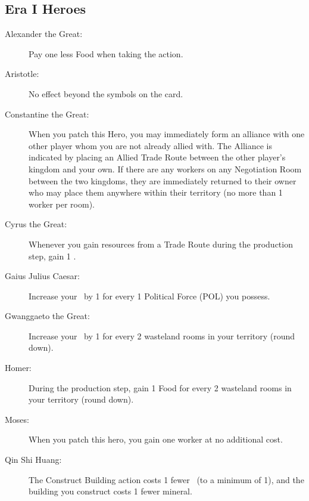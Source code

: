 \documentclass[10pt,twocolumn]{article}
\begin{document}
\begin{appendices}
\subsection{Era I Heroes}
\begin{description}
\item[Alexander the Great:] Pay one less Food when taking the  action.
\item[Aristotle:] No effect beyond the symbols on the card.
\item[Constantine the Great:] When you patch this Hero, you may immediately form an alliance with one other player whom you are not already allied with. The Alliance is indicated by placing an Allied Trade Route between the other player's kingdom and your own. If there are any workers on any Negotiation Room between the two kingdoms, they are immediately returned to their owner who may place them anywhere within their territory (no more than 1 worker per room).
\item[Cyrus the Great:] Whenever you gain resources from a Trade Route during the production step, gain 1 \vp.
\item[Gaius Julius Caesar:] Increase your \mil\ by 1 for every 1 Political Force (POL) you possess.
\item[Gwanggaeto the Great:] Increase your \mil\ by 1 for every 2 wasteland rooms in your territory (round down).
\item[Homer:] During the production step, gain 1 Food for every 2 wasteland rooms in your territory (round down).
\item[Moses:] When you patch this hero, you gain one worker at no additional cost.
\item[Qin Shi Huang:] The Construct Building action costs 1 fewer \polf\ (to a minimum of 1), and the building you construct costs 1 fewer mineral.
\end{description}

\end{appendices}
\end{document}

